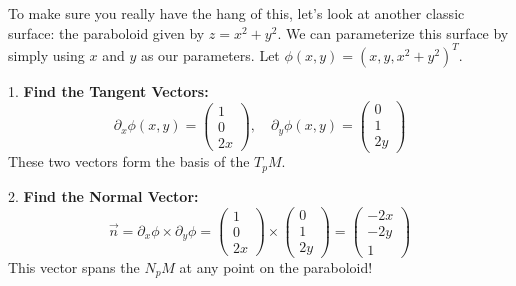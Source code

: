 \begin{example}
To make sure you really have the hang of this, let's look at another classic surface: the paraboloid given by $z = x^2 + y^2$. 
We can parameterize this surface by simply using $x$ and $y$ as our parameters. Let $\phi(x,y) = (x, y, x^2 + y^2)^T$.

1. \textbf{Find the Tangent Vectors:}
\[
\partial_x\phi(x,y) = \begin{pmatrix} 1 \\ 0 \\ 2x \end{pmatrix}, \quad \partial_y\phi(x,y) = \begin{pmatrix} 0 \\ 1 \\ 2y \end{pmatrix}
\]
These two vectors form the basis of the  $T_pM$.

2. \textbf{Find the Normal Vector:}
\[
\vec{n} = \partial_x\phi \times \partial_y\phi = \begin{pmatrix} 1 \\ 0 \\ 2x \end{pmatrix} \times \begin{pmatrix} 0 \\ 1 \\ 2y \end{pmatrix} = \begin{pmatrix} -2x \\ -2y \\ 1 \end{pmatrix}
\]
This vector spans the  $N_pM$ at any point on the paraboloid!
\end{example}

